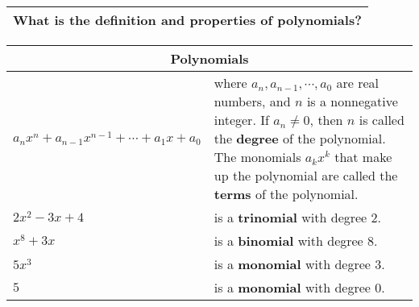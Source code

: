 \begin{small}
    \begin{tabularx}{1\textwidth}{
            p{}
        }
        \toprule
        What is the definition and properties of polynomials?
        \\
        \bottomrule

    \end{tabularx}
\end{small}
\begin{small}
    \begin{tabularx}{1\textwidth}{
            p{}
            p{}
        }

        \toprule
        \multicolumn{2}{c}{\textbf{Polynomials}} \\
        \midrule

        $ a_nx^n + a_{n-1}x^{n-1} + \cdots + a_1x + a_0 $ 
        & where $a_n, a_{n-1}, \cdots, a_0$ are real numbers, and $n$ is a
        nonnegative integer. If $a_n \neq 0$, then $n$ is called the \textbf{degree} of
        the polynomial. The monomials $a_k x^k$ that make up the polynomial are
        called the \textbf{terms} of the polynomial.
        \\
        \midrule

        $2x^2 - 3x + 4$
        &
        is a \textbf{trinomial} with degree $2$.
        \\
        \midrule

        $x^8 + 3x$
        &
        is a \textbf{binomial} with degree $8$.
        \\
        \midrule

        $5x^3$
        &
        is a \textbf{monomial} with degree $3$.
        \\
        \midrule

        $5$
        &
        is a \textbf{monomial} with degree $0$.
        \\
        \bottomrule
    \end{tabularx}
\end{small}
